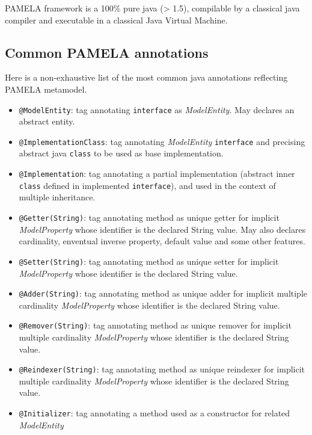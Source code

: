PAMELA framework is a 100\% pure java (> 1.5), compilable by a classical java compiler and executable in a classical Java Virtual Machine.


\subsection{Common PAMELA annotations}

Here is a non-exhaustive list of the most common java annotations reflecting PAMELA metamodel.

\begin{itemize}
    \item \texttt{@ModelEntity}: tag annotating \texttt{interface} as \emph{ModelEntity}. May declares an abstract entity.
    \item \texttt{@ImplementationClass}: tag annotating \emph{ModelEntity} \texttt{interface} and precising abstract java \texttt{class} to be used as base implementation.
    \item \texttt{@Implementation}: tag annotating a partial implementation (abstract inner \texttt{class} defined in implemented \texttt{interface}), and used in the context of multiple inheritance.
    \item \texttt{@Getter(String)}: tag annotating method as unique getter for implicit \emph{ModelProperty} whose identifier is the declared String value. May also declares cardinality, enventual inverse property, default value and some other features.
    \item \texttt{@Setter(String)}: tag annotating method as unique setter for implicit \emph{ModelProperty} whose identifier is the declared String value.
    \item \texttt{@Adder(String)}: tag annotating method as unique adder for implicit multiple cardinality \emph{ModelProperty} whose identifier is the declared String value.
    \item \texttt{@Remover(String)}: tag annotating method as unique remover for implicit multiple cardinality \emph{ModelProperty} whose identifier is the declared String value.
    \item \texttt{@Reindexer(String)}: tag annotating method as unique reindexer for implicit multiple cardinality \emph{ModelProperty} whose identifier is the declared String value.
    \item \texttt{@Initializer}: tag annotating a method used as a constructor for related \emph{ModelEntity}

\end{itemize}
